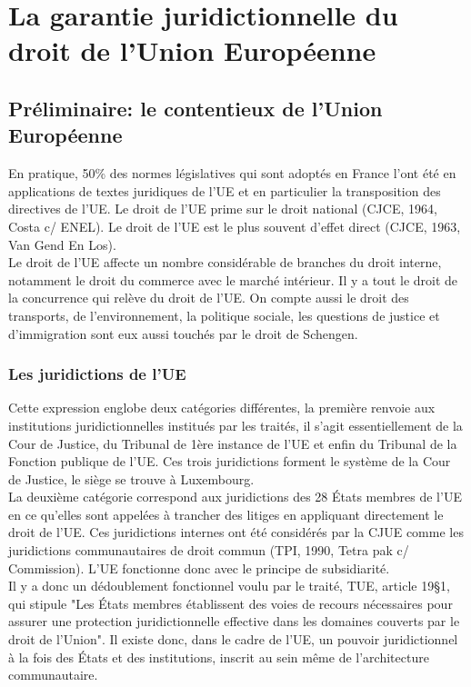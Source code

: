 \documentclass[10pt, a4paper, openany]{book}
\begin{document}
\chapter{La garantie juridictionnelle du droit de l'Union Européenne}

\section{Préliminaire: le contentieux de l'Union Européenne}

En pratique, 50\% des normes législatives qui sont adoptés en France l'ont été en applications de textes juridiques de l'UE et en particulier la transposition des directives de l'UE. Le droit de l'UE prime sur le droit national (CJCE, 1964, Costa c/ ENEL). Le droit de l'UE est le plus souvent d'effet direct (CJCE, 1963, Van Gend En Los). \\
Le droit de l'UE affecte un nombre considérable de branches du droit interne, notamment le droit du commerce avec le marché intérieur. Il y a tout le droit de la concurrence qui relève du droit de l'UE. On compte aussi le droit des transports, de l'environnement, la politique sociale, les questions de justice et d'immigration sont eux aussi touchés par le droit de Schengen. 

\subsection{Les juridictions de l'UE}

Cette expression englobe deux catégories différentes, la première renvoie aux institutions juridictionnelles institués par les traités, il s'agit essentiellement de la Cour de Justice, du Tribunal de 1ère instance de l'UE et enfin du Tribunal de la Fonction publique de l'UE. Ces trois juridictions forment le système de la Cour de Justice, le siège se trouve à Luxembourg. \\
La deuxième catégorie correspond aux juridictions des 28 États membres de l'UE en ce qu'elles sont appelées à trancher des litiges en appliquant directement le droit de l'UE. Ces juridictions internes ont été considérés par la CJUE comme les juridictions communautaires de droit commun (TPI, 1990, Tetra pak c/ Commission). L'UE fonctionne donc avec le principe de subsidiarité. \\
Il y a donc un dédoublement fonctionnel voulu par le traité, TUE, article 19§1, qui stipule "Les États membres établissent des voies de recours nécessaires pour assurer une protection juridictionnelle effective dans les domaines couverts par le droit de l'Union". Il existe donc, dans le cadre de l'UE, un pouvoir juridictionnel à la fois des États et des institutions, inscrit au sein même de l'architecture communautaire. 
\end{document}
